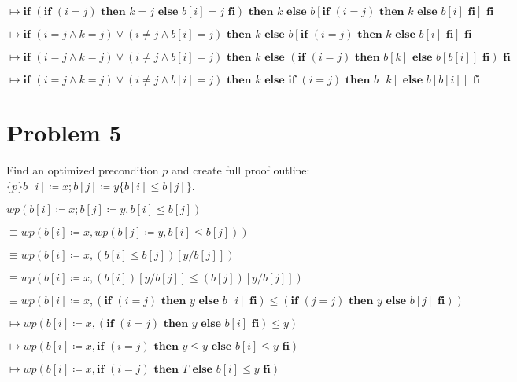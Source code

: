 \documentclass{article}
\begin{document}
\qquad \qquad $ \mapsto  \textbf{if } (\textbf{if } (i=j) \textbf{ then } k=j \textbf{ else } b[i]=j \textbf{ fi}) \textbf{ then } k \textbf{ else } b[\textbf{if } (i=j) \textbf{ then } k \textbf{ else } b[i] \textbf{ fi}] \textbf{ fi} $

\qquad \qquad $ \mapsto  \textbf{if } (i=j \wedge k=j) \vee (i \neq j \wedge b[i]=j) \textbf{ then } k \textbf{ else } b[\textbf{if } (i=j) \textbf{ then } k \textbf{ else } b[i] \textbf{ fi}] \textbf{ fi} $

\qquad \qquad $ \mapsto  \textbf{if } (i=j \wedge k=j) \vee (i \neq j \wedge b[i]=j) \textbf{ then } k \textbf{ else } (\textbf{if } (i=j) \textbf{ then } b[k] \textbf{ else } b[b[i]] \textbf{ fi}) \textbf{ fi} $

\qquad \qquad $ \mapsto  \textbf{if } (i=j \wedge k=j) \vee (i \neq j \wedge b[i]=j) \textbf{ then } k \textbf{ else if } (i=j) \textbf{ then } b[k] \textbf{ else } b[b[i]] \textbf{ fi} $

\section*{Problem 5}

Find an optimized precondition $p$ and create full proof outline: $\{p\}b[i] \coloneqq x;b[j] \coloneqq y \{b[i] \leq b[j]\}$.

\vspace{10pt}

$ wp(b[i] \coloneqq x;b[j] \coloneqq y, b[i] \leq b[j]) $

\qquad \qquad $ \equiv wp(b[i] \coloneqq x, wp(b[j] \coloneqq y, b[i] \leq b[j]))$

\qquad \qquad $ \equiv wp(b[i] \coloneqq x, (b[i] \leq b[j]) [y/b[j]])$

\qquad \qquad $ \equiv wp(b[i] \coloneqq x, (b[i])[y/b[j]] \leq (b[j])[y/b[j]])$

\qquad \qquad $ \equiv wp(b[i] \coloneqq x, (\textbf{if } (i=j) \textbf{ then } y \textbf{ else } b[i] \textbf{ fi}) \leq (\textbf{if } (j=j) \textbf{ then } y \textbf{ else } b[j] \textbf{ fi}))$

\qquad \qquad $ \mapsto wp(b[i] \coloneqq x, (\textbf{if } (i=j) \textbf{ then } y \textbf{ else } b[i] \textbf{ fi}) \leq y)$

\qquad \qquad $ \mapsto wp(b[i] \coloneqq x, \textbf{if } (i=j) \textbf{ then } y \leq y \textbf{ else } b[i] \leq y \textbf{ fi})$

\qquad \qquad $ \mapsto wp(b[i] \coloneqq x, \textbf{if } (i=j) \textbf{ then } T \textbf{ else } b[i] \leq y \textbf{ fi})$
\end{document}
